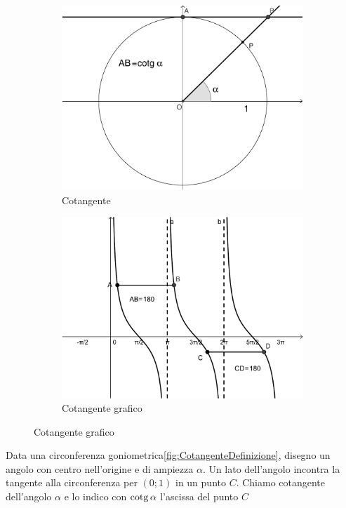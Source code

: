 \begin{figure}
	\begin{subfigure}[b]{.5\linewidth}
		\centering\includegraphics[scale=0.3]{cotgalpha-crop}
		\caption{Cotangente}\label{fig:CotangenteDefinizione}
	\end{subfigure}%
	\begin{subfigure}[b]{.5\linewidth}
		\centering\includegraphics[scale=0.3]{cotgalphagrafico-crop}
		\caption{Cotangente grafico}\label{fig:CotangenteGrafico}
	\end{subfigure}
	\label{tab:funzcotg}
\end{figure}
\begin{definizione}[Cotangente]
	Data una circonferenza goniometrica\nobs\vref{fig:CotangenteDefinizione}, disegno un angolo con centro nell'origine e di ampiezza $\alpha$. Un lato dell'angolo incontra la tangente  alla circonferenza  per $(0;1)$ in un punto $C$.  Chiamo cotangente dell'angolo $\alpha$ e lo indico con $\operatorname{cotg}\alpha$ l'ascissa  del punto $C$
\end{definizione}
